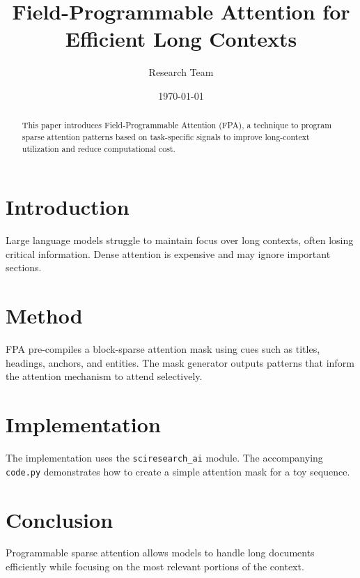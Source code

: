 \documentclass{article}
\title{Field-Programmable Attention for Efficient Long Contexts}
\author{Research Team}
\date{\today}
\begin{document}
\maketitle

\begin{abstract}
This paper introduces Field-Programmable Attention (FPA), a technique to program sparse attention patterns based on task-specific signals to improve long-context utilization and reduce computational cost.
\end{abstract}

\section{Introduction}
Large language models struggle to maintain focus over long contexts, often losing critical information. Dense attention is expensive and may ignore important sections.

\section{Method}
FPA pre-compiles a block-sparse attention mask using cues such as titles, headings, anchors, and entities. The mask generator outputs patterns that inform the attention mechanism to attend selectively.

\section{Implementation}
The implementation uses the \texttt{sciresearch\_ai} module. The accompanying \texttt{code.py} demonstrates how to create a simple attention mask for a toy sequence.

\section{Conclusion}
Programmable sparse attention allows models to handle long documents
efficiently while focusing on the most relevant portions of the
context.
\end{document}
